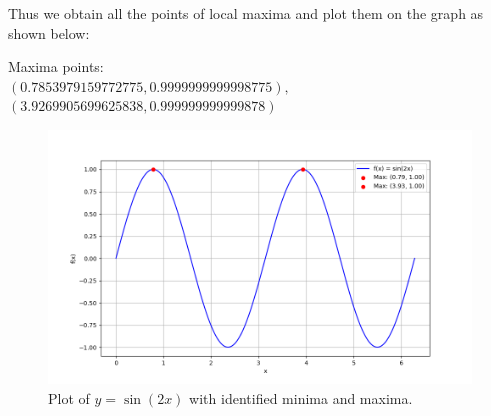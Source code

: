 \documentclass[journal]{IEEEtran}
\begin{document}
Thus we obtain all the points of local maxima and plot them on the graph as shown below:

Maxima points:\\
$
(0.7853979159772775, 0.9999999999998775), $\\
$(3.9269905699625838, 0.999999999999878)$


\begin{figure}[h!]
    \centering
    \includegraphics[width=\columnwidth]{figs/gd.png}
    \caption{Plot of \( y = \sin(2x) \) with identified minima and maxima.}
\end{figure}
\end{document}
